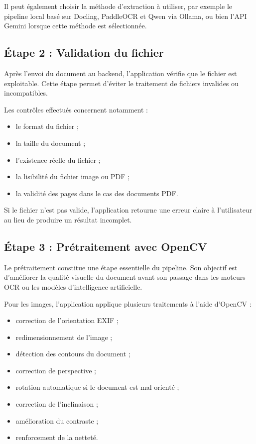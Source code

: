 Il peut également choisir la méthode d'extraction à utiliser, par exemple le pipeline local basé sur Docling, PaddleOCR et Qwen via Ollama, ou bien l'API Gemini lorsque cette méthode est sélectionnée.

\subsection{Étape 2 : Validation du fichier}

Après l'envoi du document au backend, l'application vérifie que le fichier est exploitable. Cette étape permet d'éviter le traitement de fichiers invalides ou incompatibles.

Les contrôles effectués concernent notamment :

\begin{itemize}
\item le format du fichier ;
\item la taille du document ;
\item l'existence réelle du fichier ;
\item la lisibilité du fichier image ou PDF ;
\item la validité des pages dans le cas des documents PDF.
\end{itemize}

Si le fichier n'est pas valide, l'application retourne une erreur claire à l'utilisateur au lieu de produire un résultat incomplet.

\subsection{Étape 3 : Prétraitement avec OpenCV}

Le prétraitement constitue une étape essentielle du pipeline. Son objectif est d'améliorer la qualité visuelle du document avant son passage dans les moteurs OCR ou les modèles d'intelligence artificielle.

Pour les images, l'application applique plusieurs traitements à l'aide d'OpenCV :

\begin{itemize}
\item correction de l'orientation EXIF ;
\item redimensionnement de l'image ;
\item détection des contours du document ;
\item correction de perspective ;
\item rotation automatique si le document est mal orienté ;
\item correction de l'inclinaison ;
\item amélioration du contraste ;
\item renforcement de la netteté.
\end{itemize}

